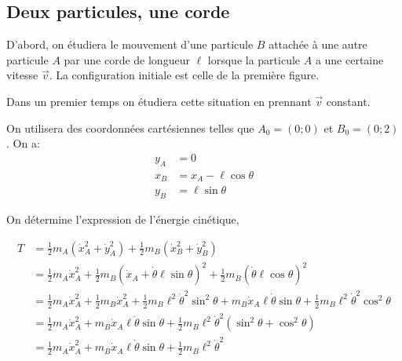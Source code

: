 \documentclass[10pt]{article}
\begin{document}
\subsection{Deux particules, une corde}

D'abord, on étudiera le mouvement d'une particule $B$ attachée à une autre particule $A$ par une corde de longueur $\ell$ lorsque la particule $A$ a une certaine vitesse $\vec{v}$. La configuration initiale est celle de la première figure.


\begin{figure}[!h]
\centering
{}
\hspace{2cm}
\end{figure}
Dans un premier temps on étudiera cette situation en prennant $\vec{v}$ constant.

On utilisera des coordonnées cartésiennes telles que $A_0 = (0;0)$ et $B_0 = (0;2)$. On a:
\begin{align*}
y_A &= 0 \\
x_B &= x_A - \ell\cos{\theta}\\
y_B &= \ell\sin{\theta}
\end{align*}

On détermine l'expression de l'énergie cinétique,

\begin{align*}
T &= \frac{1}{2}m_A(\dot{x}_A ^2 + \dot{y}_A ^2) + \frac{1}{2}m_B(\dot{x}_B ^2 + \dot{y}_B ^2) \\
 &= \frac{1}{2}m_A\dot{x}_A ^2 + \frac{1}{2}m_B(\dot{x}_A+\dot{\theta}\ell\sin{\theta})^2 + \frac{1}{2}m_B(\dot{\theta}\ell\cos{\theta})^2 \\
 &= \frac{1}{2}m_A\dot{x}_A ^2 + \frac{1}{2}m_B\dot{x}_A ^2
 + \frac{1}{2}m_B \ell^2\dot{\theta}^2\sin^2{\theta} + m_B\dot{x}_A\ell\dot{\theta}\sin{\theta} 
 + \frac{1}{2}m_B\ell^2\dot{\theta}^2 \cos^2{\theta} \\
 &= \frac{1}{2}m_A\dot{x}_A ^2 + m_B\dot{x}_A\ell\dot{\theta}\sin{\theta}
 + \frac{1}{2}m_B \ell^2\dot{\theta}^2(\sin^2{\theta} + \cos^2{\theta}) \\
 &= \frac{1}{2}m_A\dot{x}_A ^2 + m_B\dot{x}_A\ell\dot{\theta}\sin{\theta}
 + \frac{1}{2}m_B \ell^2\dot{\theta}^2
\end{align*}
\end{document}
